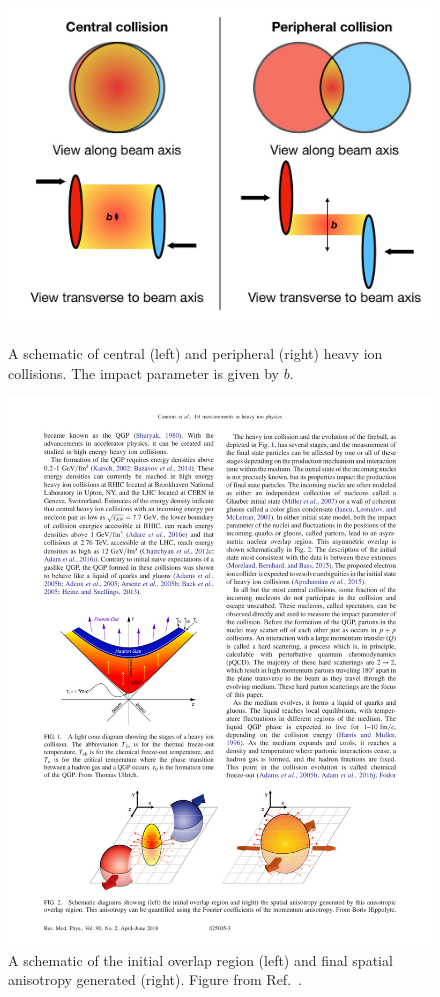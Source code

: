 \begin{figure}
\centering
\begin{minipage}[b]{0.45\textwidth}
\includegraphics[width=1.\textwidth]{figures/theory/collision_centrality}
\caption{A schematic of central (left) and peripheral (right) heavy ion collisions.
The impact parameter is given by $b$.}
\label{fig:collision_centrality}
  \end{minipage}
 \qquad 
  \begin{minipage}[b]{0.45\textwidth}
\includegraphics[width=1.\textwidth]{figures/theory/overlap}
\caption{A schematic of the initial overlap region (left) and final spatial anisotropy generated (right).
Figure from Ref.~\cite{RevModPhys.90.025005}.}
\label{fig:overlap}
\end{minipage}
\end{figure}


